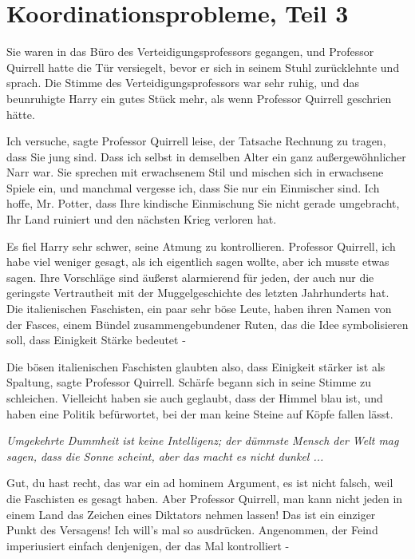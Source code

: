 \chapter{Koordinationsprobleme, Teil 3}

Sie waren in das Büro des Verteidigungsprofessors gegangen, und Professor
Quirrell hatte die Tür versiegelt, bevor er sich in seinem Stuhl zurücklehnte
und sprach. Die Stimme des Verteidigungsprofessors war sehr ruhig, und das
beunruhigte Harry ein gutes Stück mehr, als wenn Professor Quirrell geschrien
hätte.

\glqq{}Ich versuche\grqq{}, sagte Professor Quirrell leise, \glqq{}der Tatsache
Rechnung zu tragen, dass Sie jung sind. Dass ich selbst in demselben Alter ein
ganz außergewöhnlicher Narr war. Sie sprechen mit erwachsenem Stil und mischen
sich in erwachsene Spiele ein, und manchmal vergesse ich, dass Sie nur ein
Einmischer sind. Ich hoffe, Mr. Potter, dass Ihre kindische Einmischung Sie
nicht gerade umgebracht, Ihr Land ruiniert und den nächsten Krieg verloren hat.\grqq{}

Es fiel Harry sehr schwer, seine Atmung zu kontrollieren. \glqq{}Professor
Quirrell, ich habe viel weniger gesagt, als ich eigentlich sagen wollte, aber
ich musste etwas sagen. Ihre Vorschläge sind äußerst alarmierend für jeden, der
auch nur die geringste Vertrautheit mit der Muggelgeschichte des letzten
Jahrhunderts hat. Die italienischen Faschisten, ein paar sehr böse Leute, haben
ihren Namen von der Fasces, einem Bündel zusammengebundener Ruten, das die Idee
symbolisieren soll, dass Einigkeit Stärke bedeutet -\grqq{}

\glqq{}Die bösen italienischen Faschisten glaubten also, dass Einigkeit stärker
ist als Spaltung\grqq{}, sagte Professor Quirrell. Schärfe begann sich in seine
Stimme zu schleichen. \glqq{}Vielleicht haben sie auch geglaubt, dass der Himmel
blau ist, und haben eine Politik befürwortet, bei der man keine Steine auf Köpfe
fallen lässt.\grqq{}

\emph{Umgekehrte Dummheit ist keine Intelligenz; der dümmste Mensch der Welt
mag sagen, dass die Sonne scheint, aber das macht es nicht dunkel ...}

\glqq{}Gut, du hast recht, das war ein ad hominem Argument, es ist nicht falsch,
weil die Faschisten es gesagt haben. Aber Professor Quirrell, man kann nicht
jeden in einem Land das Zeichen eines Diktators nehmen lassen! Das ist ein
einziger Punkt des Versagens! Ich will's mal so ausdrücken. Angenommen, der
Feind imperiusiert einfach denjenigen, der das Mal kontrolliert -\grqq{}


